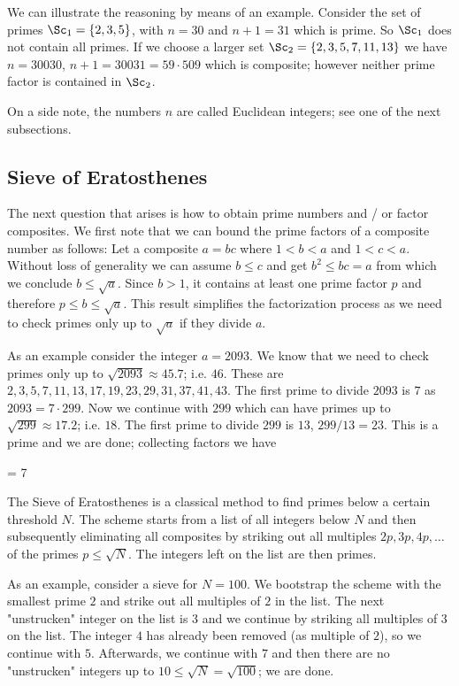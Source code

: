 We can illustrate the reasoning by means of an example. Consider the set of primes $\Sc_1 = \{2,3,5\}$, with $n = 30$ and $n+1 = 31$ which is prime. So $\Sc_1$ does not contain all primes. If we choose a larger set $\Sc_2 = \{2,3,5,7,11,13\}$ we have $n = 30030$, $n+1 = 30031 = 59 \cdot 509$ which is composite; however neither prime factor is contained in $\Sc_2$.

On a side note, the numbers $n$ are called Euclidean integers; see one of the next subsections.

\subsection{Sieve of Eratosthenes}

The next question that arises is how to obtain prime numbers and / or factor composites. We first note that we can bound the prime factors of a composite number as follows: Let a composite $a = bc$ where $1 < b < a$ and $1 < c < a$. Without loss of generality we can assume $b \leq c$ and get $b^2 \leq bc = a$ from which we conclude $b \leq \sqrt{a}$. Since $b > 1$, it contains at least one prime factor $p$ and therefore $p \leq b \leq \sqrt{a}$. This result simplifies the factorization process as we need to check primes only up to $\sqrt{a}$ if they divide $a$.

As an example consider the integer $a = 2093$. We know that we need to check primes only up to $\sqrt{2093} \approx 45.7$; i.e. $46$. These are $2, 3, 5, 7, 11, 13, 17, 19, 23, 29, 31, 37, 41, 43$. The first prime to divide $2093$ is $7$ as $2093 = 7 \cdot 299$. Now we continue with $299$ which can have primes up to $\sqrt{299} \approx 17.2$; i.e. $18$. The first prime to divide $299$ is $13$, $299 / 13 = 23$. This is a prime and we are done; collecting factors we have

 = 7  
\eee

The Sieve of Eratosthenes is a classical method to find primes below a certain threshold $N$. The scheme starts from a list of all integers below $N$ and then subsequently eliminating all composites by striking out all multiples $2p, 3p, 4p, \ldots$ of the primes $p \leq \sqrt{N}$. The integers left on the list are then primes.

As an example, consider a sieve for $N = 100$. We bootstrap the scheme with the smallest prime $2$ and strike out all multiples of $2$ in the list. The next "unstrucken" integer on the list is $3$ and we continue by striking all multiples of $3$ on the list. The integer $4$ has already been removed (as multiple of $2$), so we continue with $5$. Afterwards, we continue with $7$ and then there are no "unstrucken" integers up to $10 \leq \sqrt{N} = \sqrt{100}$; we are done.

